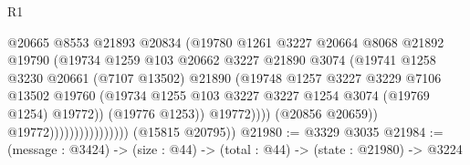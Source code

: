 \begin{lexlean}{R1}
\begin{coremodule}
                                            @20665
                                            @8553
                                            @21893
                                            @20834
                                            (@19780
                                              @1261
                                              @3227
                                              @20664
                                              @8068
                                              @21892
                                              @19790
                                              (@19734
                                                @1259
                                                @103
                                                @20662
                                                @3227
                                                @21890
                                                @3074
                                                (@19741
                                                  @1258
                                                  @3230
                                                  @20661
                                                  (@7107 @13502)
                                                  @21890
                                                  (@19748
                                                    @1257
                                                    @3227
                                                    @3229
                                                    @7106
                                                    @13502
                                                    @19760
                                                    (@19734
                                                      @1255
                                                      @103
                                                      @3227
                                                      @3227
                                                      @1254
                                                      @3074
                                                      (@19769 @1254)
                                                      @19772))
                                                  (@19776 @1253))
                                                @19772))))
                                        (@20856 @20659))
                                      @19772))))))))))))))))
      (@15815 @20795))
@21980 := @3329 @3035
@21984 := (message : @3424) -> (size : @44) -> (total : @44) -> (state : @21980) -> @3224

\end{coremodule}
\end{lexlean}
